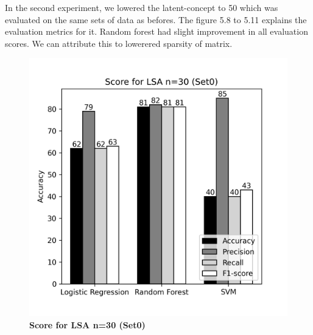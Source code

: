 \documentclass[12pt]{report}
\begin{document}
             In the second experiment, we lowered the latent-concept to 50 which was evaluated on the same sets of data as befores. The figure 5.8 to 5.11 explains the evaluation metrics for it.
             Random forest had slight improvement in all evaluation scores. We can attribute this to lowerered sparsity of matrix.




             \begin{figure}[!htb]
                \begin{minipage}{0.48\textwidth}
                  \centering
                  \includegraphics[scale=0.55]{plots/Score for LSA n=30 (Set0).png}
                  \caption{\textbf{Score for LSA n=30 (Set0)}}\label{Fig:typo1}
                \end{minipage}\hfill
                \begin{minipage}{0.48\textwidth}
                  \centering

\end{minipage}
\end{figure}
\end{document}
